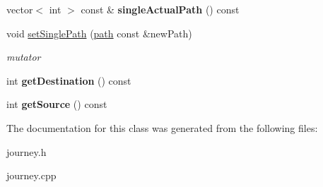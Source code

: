 \begin{DoxyCompactItemize}
\item 
\hypertarget{classjourney_aa84ec45327cdf6e7bb2b8666356533c8}{
vector$<$ int $>$ const \& {\bfseries singleActualPath} () const }
\label{classjourney_aa84ec45327cdf6e7bb2b8666356533c8}

\item 
\hypertarget{classjourney_ae9e10fe98103b032e72fe67d3a4bc213}{
void \hyperlink{classjourney_ae9e10fe98103b032e72fe67d3a4bc213}{setSinglePath} (\hyperlink{classpath}{path} const \&newPath)}
\label{classjourney_ae9e10fe98103b032e72fe67d3a4bc213}

\begin{DoxyCompactList}\small\item\em mutator \end{DoxyCompactList}\item 
\hypertarget{classjourney_a701adb2f07aaa7525a559b0fb2405ab6}{
int {\bfseries getDestination} () const }
\label{classjourney_a701adb2f07aaa7525a559b0fb2405ab6}

\item 
\hypertarget{classjourney_a34d25705facfbeeb76346af62fe36254}{
int {\bfseries getSource} () const }
\label{classjourney_a34d25705facfbeeb76346af62fe36254}

\end{DoxyCompactItemize}


The documentation for this class was generated from the following files:\begin{DoxyCompactItemize}
\item 
journey.h\item 
journey.cpp\end{DoxyCompactItemize}
